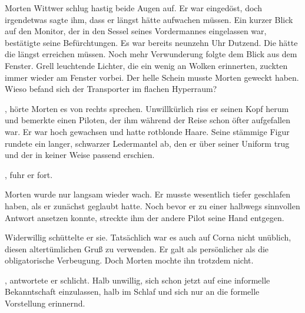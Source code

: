 Morten Wittwer schlug hastig beide Augen auf. Er war eingedöst, doch irgendetwas sagte ihm, dass er längst hätte aufwachen müssen. Ein kurzer Blick auf den Monitor, der in den Sessel seines Vordermannes eingelassen war, bestätigte seine Befürchtungen. Es war bereits neunzehn Uhr Dutzend. Die  hätte die  längst erreichen müssen. Noch mehr Verwunderung folgte dem Blick aus dem Fenster. Grell leuchtende Lichter, die ein wenig an Wolken erinnerten, zuckten immer wieder am Fenster vorbei. Der helle Schein musste Morten geweckt haben. Wieso befand sich der Transporter im flachen Hyperraum?

\par

, hörte Morten es von rechts sprechen. Unwillkürlich riss er seinen Kopf herum und bemerkte einen Piloten, der ihm während der Reise schon öfter aufgefallen war. Er war hoch gewachsen und hatte rotblonde Haare. Seine stämmige Figur rundete ein langer, schwarzer Ledermantel ab, den er über seiner Uniform trug und der in keiner Weise passend erschien.

\par

, fuhr er fort. 

\par

Morten wurde nur langsam wieder wach. Er musste wesentlich tiefer geschlafen haben, als er zunächst geglaubt hatte. Noch bevor er zu einer halbwegs sinnvollen Antwort ansetzen konnte, streckte ihm der andere Pilot seine Hand entgegen. 

\par

Widerwillig schüttelte er sie. Tatsächlich war es auch auf Corna nicht unüblich, diesen altertümlichen Gruß zu verwenden. Er galt als persönlicher als die obligatorische Verbeugung. Doch Morten mochte ihn trotzdem nicht.

\par

, antwortete er schlicht. Halb unwillig, sich schon jetzt auf eine informelle Bekanntschaft einzulassen, halb im Schlaf und sich nur an die formelle Vorstellung erinnernd.

\par

